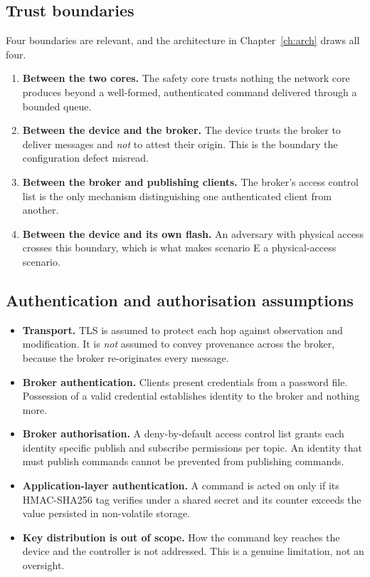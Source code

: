 \subsection{Trust boundaries}

Four boundaries are relevant, and the architecture in Chapter~\ref{ch:arch} draws all four.

\begin{enumerate}[leftmargin=1.8em,itemsep=4pt]
  \item \textbf{Between the two cores.} The safety core trusts nothing the network core
        produces beyond a well-formed, authenticated command delivered through a bounded queue.
  \item \textbf{Between the device and the broker.} The device trusts the broker to deliver
        messages and \emph{not} to attest their origin. This is the boundary the configuration
        defect misread.
  \item \textbf{Between the broker and publishing clients.} The broker's access control list is
        the only mechanism distinguishing one authenticated client from another.
  \item \textbf{Between the device and its own flash.} An adversary with physical access
        crosses this boundary, which is what makes scenario E a physical-access scenario.
\end{enumerate}

\subsection{Authentication and authorisation assumptions}

\begin{itemize}[leftmargin=1.6em,itemsep=4pt]
  \item \textbf{Transport.} TLS is assumed to protect each hop against observation and
        modification. It is \emph{not} assumed to convey provenance across the broker, because
        the broker re-originates every message.
  \item \textbf{Broker authentication.} Clients present credentials from a password file.
        Possession of a valid credential establishes identity to the broker and nothing more.
  \item \textbf{Broker authorisation.} A deny-by-default access control list grants each
        identity specific publish and subscribe permissions per topic. An identity that must
        publish commands cannot be prevented from publishing commands.
  \item \textbf{Application-layer authentication.} A command is acted on only if its
        HMAC-SHA256 tag verifies under a shared secret and its counter exceeds the value
        persisted in non-volatile storage.
  \item \textbf{Key distribution is out of scope.} How the command key reaches the device and
        the controller is not addressed. This is a genuine limitation, not an oversight.
\end{itemize}

